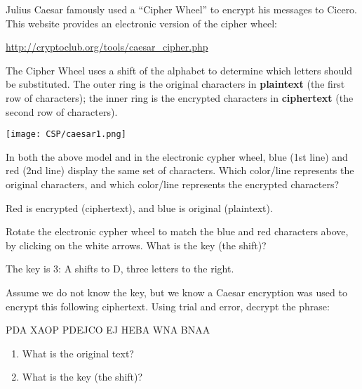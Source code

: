 

Julius Caesar famously used a ``Cipher Wheel'' to encrypt his messages to Cicero.
This website provides an electronic version of the cipher wheel:

\begin{center}
\url{http://cryptoclub.org/tools/caesar_cipher.php}
\end{center}

The Cipher Wheel uses a shift of the alphabet to determine which letters should be substituted.
The outer ring is the original characters in \textbf{plaintext} (the first row of characters); the inner ring is the encrypted characters in \textbf{ciphertext} (the second row of characters).

\begin{center}
\texttt{[image: CSP/caesar1.png]}
\end{center}




\Q In both the above model and in the electronic cypher wheel, blue (1st line) and red (2nd line) display the same set of characters.
Which color/line represents the original characters, and which color/line represents the encrypted characters?

\begin{answer}
Red is encrypted (ciphertext), and blue is original (plaintext).
\end{answer}


\Q Rotate the electronic cypher wheel to match the blue and red characters above, by clicking on the white arrows.
What is the key (the shift)?

\begin{answer}
The key is 3: A shifts to D, three letters to the right.
\end{answer}


\Q Assume we do not know the key, but we know a Caesar encryption was used to encrypt this following ciphertext.
Using trial and error, decrypt the phrase:

\begin{center}
PDA XAOP PDEJCO EJ HEBA WNA BNAA
\end{center}

\begin{enumerate}

\item What is the original text?


\item What is the key (the shift)?


\end{enumerate}


